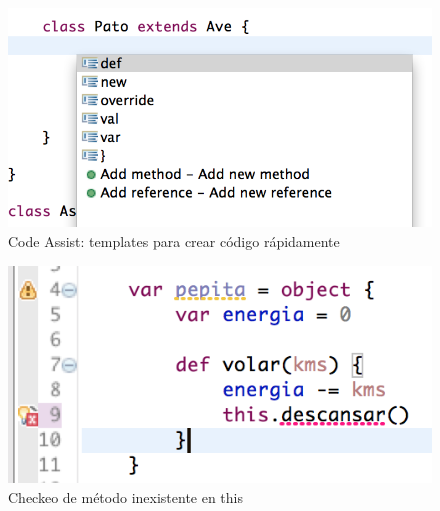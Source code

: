 	\begin{figure}[p]
	    \centering
		\includegraphics[scale=0.5]{images/wollok-paper-codetemplates.png}
	    \caption{Code Assist: templates para crear código rápidamente}
	    \label{fig:codetemplates.png}
	\end{figure}

	\begin{figure}[p]
	    \centering
		\includegraphics[scale=0.5]{images/wollok-paper-check-noMethodOnThis.png}
	    \caption{Checkeo de método inexistente en this}
	    \label{fig:check-noMethodOnThis.png}
	\end{figure}


